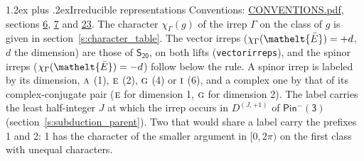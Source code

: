 \documentclass[10pt,a4paper]{article}
\makeatletter
\renewcommand\section{\@startsection{section}{1}{\z@}{-3ex plus -1ex minus -.2ex}%
  {1.2ex plus .2ex}{\normalfont\large\sffamily\bfseries\color{parttitle}}}
\numberwithin{equation}{section}
\newcommand{\eltfont}[1]{{\let\sigma\eltsigma\mathelt{#1}}}
\newcommand{\grp}[1]{\mathsf{#1}}
\newcommand{\irr}[1]{\text{\normalfont\scshape #1}}
\newcommand{\elt}[1]{\eltfont{#1}}
\newcommand{\irrJp}[2]{D^{(#1,#2)}}
\newcommand{\irchar}[1]{\chi_{#1}}
\newcommand{\barred}[1]{\bar{#1}}
\makeatother
\begin{document}
\section{Irreducible representations}\label{s:irreps}
Conventions: \href{../../CONVENTIONS.pdf}{CONVENTIONS.pdf}, sections \href{../../../rotation/CONVENTIONS.pdf\#conv.6}{6}, \href{../../../rotation/CONVENTIONS.pdf\#conv.7}{7} and \href{../../CONVENTIONS.pdf\#conv.23}{23}.
\leavevmode\label{n:function.character}\label{n:irrep.Gamma}The character $\irchar{\Gamma}(g)$ of the irrep $\Gamma$ on the class of $g$ is given in section~\ref{s:character_table}. \label{n:index.dimension}The vector irreps ($\irchar{\Gamma}(\elt{\barred{E}}) = +d$, $d$ the dimension) are those of \href{../../../rotation/data/pdf/S20.pdf}{$\grp{S_{20}}$}, on both lifts (\texttt{vectorirreps}), and the spinor irreps ($\irchar{\Gamma}(\elt{\barred{E}}) = -d$) follow below the rule. A spinor irrep is labeled by its dimension, $\irr{a}$ (1), $\irr{e}$ (2), $\irr{g}$ (4) or $\irr{i}$ (6), and a complex one by that of its complex-conjugate pair ($\irr{e}$ for dimension 1, $\irr{g}$ for dimension 2). The label carries the least half-integer $J$ at which the irrep occurs in $\irrJp{J}{+1}$ of $\grp{Pin^{-}(3)}$ (section~\ref{s:subduction_parent}). Two that would share a label carry the prefixes 1 and 2: 1 has the character of the smaller argument in $[0, 2\pi)$ on the first class with unequal characters.
\end{document}
